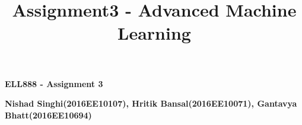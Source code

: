 \documentclass[11pt]{article}
\title{Assignment3 - Advanced Machine Learning}								%
\makeatletter
\let\thetitle\@title
\makeatother
\begin{document}

	
            
        
	
\begin{center}
    \textbf{ELL888 - Assignment 3} \\
\end{center}
{\footnotesize \textbf{Nishad Singhi(2016EE10107), Hritik Bansal(2016EE10071), Gantavya Bhatt(2016EE10694)}}
\end{document}
